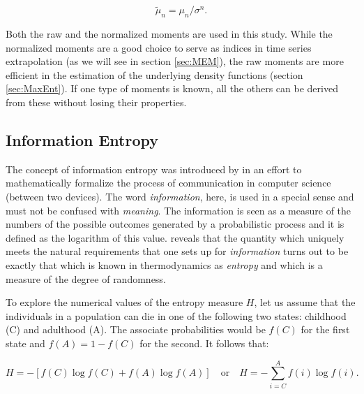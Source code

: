 \documentclass[T0_MEM]{subfiles}
\begin{document}
\begin{equation}\label{eq:Nmoment}
\tilde{\mu}_n = \mu_n / \sigma^n.
\end{equation}

Both the raw and the normalized moments are used in this study. While the normalized moments are a good choice to serve as indices in time series extrapolation (as we will see in section \ref{sec:MEM}), the raw moments are more efficient in the estimation of the underlying density functions (section \ref{sec:MaxEnt}). If one type of moments is known, all the others can be derived from these without losing their properties.

\subsection{Information Entropy}\label{sec:entropy}

The concept of information entropy was introduced by \cite{shannon1948} in an effort to mathematically formalize the process of communication in computer science (between two devices). The word \emph{information}, here, is used in a special sense and must not be confused with \emph{meaning}. The information is seen as a measure of the numbers of the possible outcomes generated by a probabilistic process and it is defined as the logarithm of this value. \cite{warren1949} reveals that the quantity which uniquely meets the natural requirements that one sets up for \emph{information} turns out to be exactly that which is known in thermodynamics as \emph{entropy} and which is a measure of the degree of randomness.

To explore the numerical values of the entropy measure $H$, let us assume that the individuals in a population can die in one of the following two states: childhood (C) and adulthood (A). The associate probabilities would be $f(C)$ for the first state and $f(A) = 1 - f(C)$ for the second. It follows that:

\begin{equation}
H = - \left[ f(C) \log f(C) + f(A) \log f(A) \right]
\quad \textrm{or} \quad
H = - \sum_{i = C}^{A} f(i)\log f(i).
\end{equation}
\end{document}
